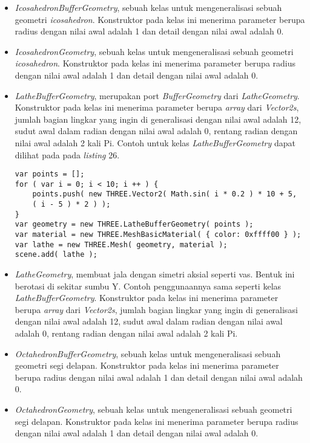 \documentclass[a4paper,twoside]{article}
\begin{document}
\begin{enumerate}
\begin{itemize}
\begin{itemize}
	\item {\it IcosahedronBufferGeometry}, sebuah kelas untuk mengeneralisasi sebuah geometri {\it icosahedron}. Konstruktor pada kelas ini menerima parameter berupa radius dengan nilai awal adalah 1 dan detail dengan nilai awal adalah 0.

	\item {\it IcosahedronGeometry}, sebuah kelas untuk mengeneralisasi sebuah geometri {\it icosahedron}. Konstruktor pada kelas ini menerima parameter berupa radius dengan nilai awal adalah 1 dan detail dengan nilai awal adalah 0.

	\item {\it LatheBufferGeometry}, merupakan port {\it BufferGeometry} dari {\it LatheGeometry}. Konstruktor pada kelas ini menerima parameter berupa {\it array} dari {\it Vector2s}, jumlah bagian lingkar yang ingin di generalisasi dengan nilai awal adalah 12, sudut awal dalam radian dengan nilai awal adalah 0, rentang radian dengan nilai awal adalah 2 kali Pi. Contoh untuk kelas {\it LatheBufferGeometry} dapat dilihat pada pada {\it listing} 26.
	
\begin{lstlisting}[caption={Contoh penggunaan kelas {\it LatheBufferGeometry}.},captionpos=b]
var points = [];
for ( var i = 0; i < 10; i ++ ) {
	points.push( new THREE.Vector2( Math.sin( i * 0.2 ) * 10 + 5,
	( i - 5 ) * 2 ) );
}
var geometry = new THREE.LatheBufferGeometry( points );
var material = new THREE.MeshBasicMaterial( { color: 0xffff00 } );
var lathe = new THREE.Mesh( geometry, material );
scene.add( lathe );
\end{lstlisting}

	\item {\it LatheGeometry}, membuat jala dengan simetri aksial seperti vas. Bentuk ini berotasi di sekitar sumbu Y. Contoh penggunaannya sama seperti kelas {\it LatheBufferGeometry}. Konstruktor pada kelas ini menerima parameter berupa {\it array} dari {\it Vector2s}, jumlah bagian lingkar yang ingin di generalisasi dengan nilai awal adalah 12, sudut awal dalam radian dengan nilai awal adalah 0, rentang radian dengan nilai awal adalah 2 kali Pi.
	
	\item {\it OctahedronBufferGeometry}, sebuah kelas untuk mengeneralisasi sebuah geometri segi delapan. Konstruktor pada kelas ini menerima parameter berupa radius dengan nilai awal adalah 1 dan detail dengan nilai awal adalah 0.
	
	\item {\it OctahedronGeometry}, sebuah kelas untuk mengeneralisasi sebuah geometri segi delapan. Konstruktor pada kelas ini menerima parameter berupa radius dengan nilai awal adalah 1 dan detail dengan nilai awal adalah 0.
	

\end{itemize}
\end{itemize}
\end{enumerate}
\end{document}
